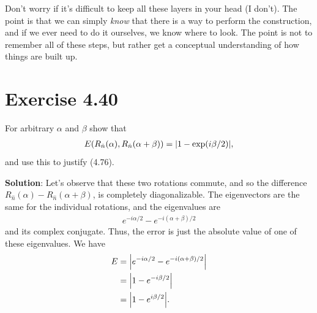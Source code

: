 \documentclass{book}
\begin{document}
    Don't worry if it's difficult to keep all these layers in your head (I don't). The point is that we can simply \emph{know} that there is a way to perform the construction, and if we ever need to do it ourselves, we know where to look. The point is not to remember all of these steps, but rather get a conceptual understanding of how things are built up.
    
\section*{Exercise 4.40}
    For arbitrary $\alpha$ and $\beta$ show that 
    \begin{align}
        E(R_{\hat{n}}(\alpha), R_{\hat{n}}(\alpha + \beta)) = \abs{1 - \exp(i\beta/2)},
    \end{align}
    and use this to justify (4.76).

    \textbf{Solution}: Let's observe that these two rotations commute, and so the difference $R_{\hat{n}}(\alpha)- R_{\hat{n}}(\alpha + \beta)$, is completely diagonalizable. The eigenvectors are the same for the individual rotations, and the eigenvalues are 
    \begin{align}
        e^{-i\alpha/2} - e^{-i(\alpha + \beta)/2}
    \end{align}
    and its complex conjugate. Thus, the error is just the absolute value of one of these eigenvalues. We have
    \begin{align}
    \begin{aligned}
        E &= \abs{e^{-i\alpha/2} - e^{-i(\alpha + \beta)/2}} \\
        &= \abs{1 - e^{-i\beta/2}} \\
        &= \abs{1 - e^{i\beta/2}}.
    \end{aligned}
    \end{align}
\end{document}

